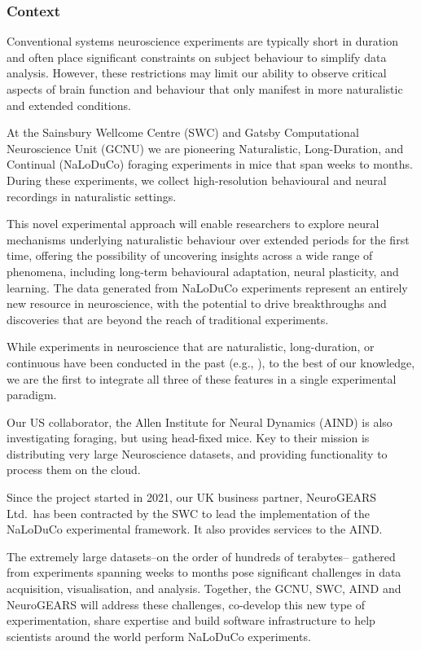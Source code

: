 \subsubsection{Context}

Conventional systems neuroscience experiments are typically short in duration
and often place significant constraints on subject behaviour to simplify data
analysis.
%
However, these restrictions may limit our ability to observe critical
aspects of brain function and behaviour that only manifest in more naturalistic
and extended conditions.

At the Sainsbury Wellcome Centre (SWC) and Gatsby Computational Neuroscience
Unit (GCNU) we are pioneering Naturalistic, Long-Duration, and Continual
(NaLoDuCo) foraging experiments in mice that span weeks to months. During these
experiments, we collect high-resolution behavioural and neural recordings in
naturalistic settings.

This novel experimental approach will enable researchers to explore neural
mechanisms underlying naturalistic behaviour over extended periods for the first
time, offering the possibility of uncovering insights across a wide range of
phenomena, including long-term behavioural adaptation, neural plasticity, and
learning.
%
The data generated from NaLoDuCo experiments represent an entirely new resource
in neuroscience, with the potential to drive breakthroughs and discoveries that
are beyond the reach of traditional experiments.

While experiments in neuroscience that are naturalistic, long-duration, or
continuous have been conducted in the past
(e.g., \cite{volohEtAl23}), to the best of our
knowledge, we are the first to integrate all three of these features in a
single experimental paradigm.

Our US collaborator, the Allen Institute for Neural Dynamics (AIND) is also investigating
foraging, but using head-fixed mice. Key to their mission is distributing very large Neuroscience datasets,
and providing functionality to process them on the cloud.

Since the project started in 2021, our UK business partner, NeuroGEARS Ltd.\ 
has been contracted by the SWC to lead the implementation of the NaLoDuCo
experimental framework. It also provides services to the AIND.

The extremely large datasets--on the order of hundreds of terabytes-- gathered
from experiments spanning weeks to months pose significant challenges in data
acquisition, visualisation, and analysis.
%
Together, the GCNU, SWC, AIND and NeuroGEARS will address these challenges,
co-develop this new type of experimentation, share expertise and build software
infrastructure to help scientists around the world perform NaLoDuCo
experiments.


